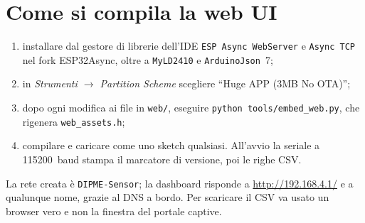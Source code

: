 \section{Come si compila la web UI}

\begin{enumerate}[leftmargin=1.8em,itemsep=2pt]
  \item installare dal gestore di librerie dell'IDE \texttt{ESP Async WebServer} e
        \texttt{Async TCP} nel fork ESP32Async, oltre a \texttt{MyLD2410} e
        \texttt{ArduinoJson}~7;
  \item in \emph{Strumenti $\to$ Partition Scheme} scegliere ``Huge APP (3MB No
        OTA)'';
  \item dopo ogni modifica ai file in \texttt{web/}, eseguire
        \texttt{python tools/embed\_web.py}, che rigenera \texttt{web\_assets.h};
  \item compilare e caricare come uno sketch qualsiasi. All'avvio la seriale a
        115200~baud stampa il marcatore di versione, poi le righe CSV.
\end{enumerate}

La rete creata è \texttt{DIPME-Sensor}; la dashboard risponde a
\url{http://192.168.4.1/} e a qualunque nome, grazie al DNS a bordo. Per
scaricare il CSV va usato un browser vero e non la finestra del portale captive.
